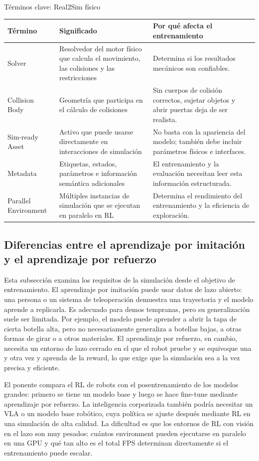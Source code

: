 \documentclass[a4paper]{article}
\begin{document}
\begin{knowledgebox}{Términos clave: Real2Sim físico}
\begin{tabularx}{\textwidth}{p{}p{}X}
\toprule
Término & Significado & Por qué afecta el entrenamiento \\
\midrule
Solver & Resolvedor del motor físico que calcula el movimiento, las colisiones y las restricciones & Determina si los resultados mecánicos son confiables. \\
Collision Body & Geometría que participa en el cálculo de colisiones & Sin cuerpos de colisión correctos, sujetar objetos y abrir puertas deja de ser realista. \\
Sim-ready Asset & Activo que puede usarse directamente en interacciones de simulación & No basta con la apariencia del modelo; también debe incluir parámetros físicos e interfaces. \\
Metadata & Etiquetas, estados, parámetros e información semántica adicionales & El entrenamiento y la evaluación necesitan leer esta información estructurada. \\
Parallel Environment & Múltiples instancias de simulación que se ejecutan en paralelo en RL & Determina el rendimiento del entrenamiento y la eficiencia de exploración. \\
\bottomrule
\end{tabularx}
\end{knowledgebox}

\subsection{Diferencias entre el aprendizaje por imitación y el aprendizaje por refuerzo}

Esta subsección examina los requisitos de la simulación desde el objetivo de entrenamiento. El aprendizaje por imitación puede usar datos de lazo abierto: una persona o un sistema de teleoperación demuestra una trayectoria y el modelo aprende a replicarla. Es adecuado para demos tempranas, pero su generalización suele ser limitada. Por ejemplo, el modelo puede aprender a abrir la tapa de cierta botella alta, pero no necesariamente generaliza a botellas bajas, a otras formas de girar o a otros materiales. El aprendizaje por refuerzo, en cambio, necesita un entorno de lazo cerrado en el que el robot pruebe y se equivoque una y otra vez y aprenda de la reward, lo que exige que la simulación sea a la vez precisa y eficiente.

El ponente compara el RL de robots con el posentrenamiento de los modelos grandes: primero se tiene un modelo base y luego se hace fine-tune mediante aprendizaje por refuerzo. La inteligencia corporizada también podría necesitar un VLA o un modelo base robótico, cuya política se ajuste después mediante RL en una simulación de alta calidad. La dificultad es que los entornos de RL con visión en el lazo son muy pesados: cuántos environment pueden ejecutarse en paralelo en una GPU y qué tan alto es el total FPS determinan directamente si el entrenamiento puede escalar.
\end{document}
